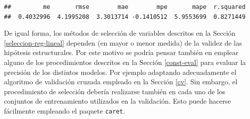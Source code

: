 \documentclass[
  spanish,
]{book}
\newenvironment{Shaded}{\begin{snugshade}}{\end{snugshade}}
\newcommand{\CommentTok}[1]{\textcolor[rgb]{0.56,0.35,0.01}{\textit{#1}}}
\newcommand{\ControlFlowTok}[1]{\textcolor[rgb]{0.13,0.29,0.53}{\textbf{#1}}}
\newcommand{\DataTypeTok}[1]{\textcolor[rgb]{0.13,0.29,0.53}{#1}}
\newcommand{\DecValTok}[1]{\textcolor[rgb]{0.00,0.00,0.81}{#1}}
\newcommand{\KeywordTok}[1]{\textcolor[rgb]{0.13,0.29,0.53}{\textbf{#1}}}
\newcommand{\NormalTok}[1]{#1}
\newcommand{\OperatorTok}[1]{\textcolor[rgb]{0.81,0.36,0.00}{\textbf{#1}}}
\newcommand{\OtherTok}[1]{\textcolor[rgb]{0.56,0.35,0.01}{#1}}
\newcommand{\StringTok}[1]{\textcolor[rgb]{0.31,0.60,0.02}{#1}}
\theoremstyle{break}
\theoremstyle{definition}
\theoremstyle{definition}
\theoremstyle{definition}
\theoremstyle{remark}
\begin{document}
\begin{Shaded}
\end{Shaded}

\begin{verbatim}
##         me       rmse        mae        mpe       mape  r.squared 
##  0.4032996  4.1995208  3.3013714 -0.1410512  5.9553699  0.8271449
\end{verbatim}

De igual forma, los métodos de selección de variables descritos en la Sección \ref{seleccion-reg-lineal} dependen (en mayor o menor medida) de la validez de las hipótesis estructurales.
Por este motivo se podría pensar también en emplear alguno de los procedimientos descritos en la Sección \ref{const-eval} para evaluar la precisión de los distintos modelos.
Por ejemplo adaptando adecuadamente el algoritmo de validación cruzada empleado en la Sección \ref{cv}.
Sin embargo, el procedimiento de selección debería realizarse también en cada uno de los conjuntos de entrenamiento utilizados en la validación.
Esto puede hacerse fácilmente empleando el paquete \texttt{caret}.
\end{document}
